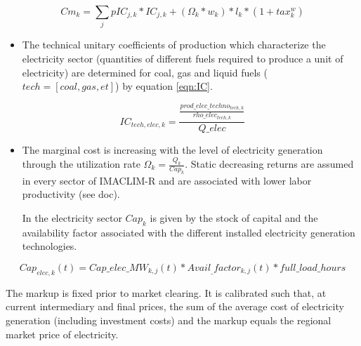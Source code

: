\begin{dmath}
    Cm_{k} = \sum_{j}{}pIC_{j,k}*IC_{j,k} + (\Omega_{k}*w_{k})*l_{k}*(1+tax_{k}^{w})
    \label{eqn:Cm}
\end{dmath}

\begin{itemize}
    \item The technical unitary coefficients of production which characterize the electricity sector (quantities of different fuels required to produce a unit of electricity) are determined for coal, gas and liquid fuels ($tech = [coal,gas,et]$) by equation \ref{eqn:IC}.
\end{itemize}


\begin{dmath}
    IC_{tech,elec,k} = \frac{\frac{prod\_elec\_techno_{tech,k}}{rho\_elec_{tech,k}}}{Q\_elec}
    \label{eqn:IC}
\end{dmath}

\begin{itemize}
    \item The marginal cost is increasing with the level of electricity generation through the utilization rate $\Omega_{k} = \frac{Q_{k}}{Cap_{k}}$. Static decreasing returns are assumed in every sector of IMACLIM-R and are associated with lower labor productivity (see doc).

 In the electricity sector $Cap_{k}$ is given by the stock of capital and the availability factor associated with the different installed electricity generation technologies.
\end{itemize}
\begin{dmath}
    Cap_{elec,k}(t) =  Cap\_elec\_MW_{k,j}(t)*Avail_\_factor_{k,j}(t)*full\_load\_hours
    \label{eqn:Cap}
\end{dmath}


The markup is fixed prior to market clearing. It is calibrated such that, at current intermediary and final prices, the sum of the average cost of electricity generation (including investment costs) and the markup equals the regional market price of electricity.


